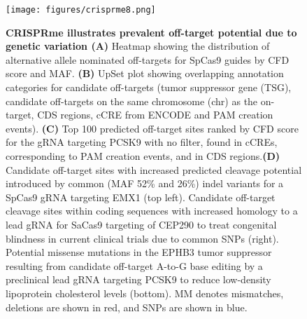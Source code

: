 \documentclass[a4paper, titlepage, openright]{book}
\begin{document}
\begin{figure}
	\centering
	\texttt{[image: figures/crisprme8.png]}
	\caption[CRISPRme illustrates prevalent off-target potential due to genetic variation]{\textbf{CRISPRme illustrates prevalent off-target potential due to genetic variation (A)} Heatmap showing the distribution of alternative allele nominated off-targets for SpCas9 guides by CFD score and MAF. \textbf{(B)} UpSet plot showing overlapping annotation categories for candidate off-targets (tumor suppressor gene (TSG), candidate off-targets on the same chromosome (chr) as the on-target, CDS regions, cCRE from ENCODE and PAM creation events).  \textbf{(C)} Top 100 predicted off-target sites ranked by CFD score for the gRNA targeting PCSK9 with no filter, found in cCREs, corresponding to PAM creation events, and in CDS regions.\textbf{(D)} Candidate off-target sites with increased predicted cleavage potential introduced by common (MAF 52\% and 26\%) indel variants for a SpCas9 gRNA targeting EMX1 (top left). Candidate off-target cleavage sites within coding sequences with increased homology to a lead gRNA for SaCas9 targeting of CEP290 to treat congenital blindness in current clinical trials due to common SNPs (right). Potential missense mutations in the EPHB3 tumor suppressor resulting from candidate off-target A-to-G base editing by a preclinical lead gRNA targeting PCSK9 to reduce low-density lipoprotein cholesterol levels (bottom). MM denotes mismatches, deletions are shown in red, and SNPs are shown in blue.}
	\label{fig:crisprme8}
\end{figure}
\end{document}

